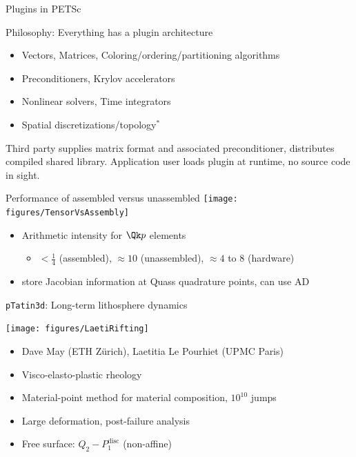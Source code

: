 \documentclass{beamer}
\begin{document}
\begin{frame}{Plugins in PETSc}
\begin{block}{Philosophy: Everything has a plugin architecture}
\begin{itemize}
  \item Vectors, Matrices, Coloring/ordering/partitioning algorithms
  \item Preconditioners, Krylov accelerators
  \item Nonlinear solvers, Time integrators
  \item Spatial discretizations/topology$^*$
\end{itemize}
\end{block}
\begin{example}
	Third party supplies matrix format and associated preconditioner, distributes
	compiled shared library.  Application user loads plugin at runtime, no source
	code in sight.
\end{example}
\end{frame}

\begin{frame}[shrink=5]{Performance of assembled versus unassembled}
  \vspace{1ex}
  \texttt{[image: figures/TensorVsAssembly]} \\
  \begin{itemize}
  \item Arithmetic intensity for $\Qk p$ elements
    \begin{itemize}
    \item $< \frac 1 4$ (assembled), $\approx 10$ (unassembled), $\approx 4$ to $8$ (hardware)
    \end{itemize}
  \item store Jacobian information at Quass quadrature points, can use AD
  \end{itemize}
\end{frame}



\begin{frame}{\texttt{pTatin3d}: Long-term lithosphere dynamics}
  \begin{center}
    \texttt{[image: figures/LaetiRifting]}
  \end{center}
  \begin{itemize}
  \item Dave May (ETH Z\"urich), Laetitia Le Pourhiet (UPMC Paris)
  \item Visco-elasto-plastic rheology
  \item Material-point method for material composition, $10^{10}$ jumps
  \item Large deformation, post-failure analysis
  \item Free surface: $Q_2 - P_1^{\text{disc}}$ (non-affine)
  \end{itemize}
\end{frame}
\end{document}

